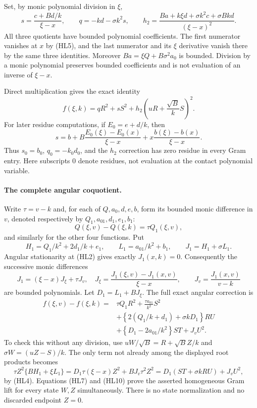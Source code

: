 Set, by monic polynomial division in $\xi$,
\[
 s=\frac{c+Bd/k}{\xi-x},\qquad
 q=-kd-\sigma k^2s,\qquad
 h_2=\frac{Ba+k\xi d+\sigma k^2c+\sigma Bkd}
                    {(\xi-x)^2}.                 \tag{HL6}
\]
All three quotients have bounded polynomial coefficients.  The first
numerator vanishes at $x$ by (HL5), and the last numerator and its
$\xi$ derivative vanish there by the same three identities.
Moreover $Ba=\xi Q+B\sigma^2a_0$ is bounded.  Division by a monic
polynomial preserves bounded coefficients and is not evaluation of
an inverse of $\xi-x$.

Direct multiplication gives the exact identity
\[
 f(\xi,k)=qR^2+sS^2
                  +h_2\left(uR+\frac{\sqrt B}{k}S\right)^2.
                                                               \tag{HL7}
\]
For later residue computations, if $E_0=e+d/k$, then
\[
 s=b+B\frac{E_0(\xi)-E_0(x)}{\xi-x}
       +x\frac{b(\xi)-b(x)}{\xi-x}.                \tag{HL8}
\]
Thus $s_0=b_0$, $q_0=-k_0d_0$, and the $h_2$ correction has zero
residue in every Gram entry.  Here subscripts $0$ denote residues,
not evaluation at the contact polynomial variable.

\paragraph{The complete angular coquotient.}
Write $\tau=v-k$ and, for each of $Q,a_0,d,e,b$, form its bounded
monic difference in $v$, denoted respectively by
$Q_1,a_{01},d_1,e_1,b_1$:
\[
 Q(\xi,v)-Q(\xi,k)=\tau Q_1(\xi,v),
\]
and similarly for the other four functions.  Put
\[
 H_1=Q_1/k^2+2d_1/k+e_1,\qquad
 L_1=a_{01}/k^2+b_1,\qquad J_1=H_1+\sigma L_1.
\]
Angular stationarity at (HL2) gives exactly $J_1(x,k)=0$.
Consequently the successive monic differences
\[
 J_1=(\xi-x)J_\xi+\tau J_v,
 \quad
 J_\xi=\frac{J_1(\xi,v)-J_1(x,v)}{\xi-x},\qquad
 J_v=\frac{J_1(x,v)}{v-k}                            \tag{HL9}
\]
are bounded polynomials.  Let $D_1=L_1+BJ_\xi$.  The full exact
angular correction is
\begin{align*}
 f(\xi,v)-f(\xi,k)={}&
 \tau Q_1R^2+\frac{\tau a_{01}}{k^2}S^2\\
 &+\left\{2(Q_1/k+d_1)+\sigma kD_1\right\}RU\\
 &+\left\{D_1-2a_{01}/k^2\right\}ST+J_vU^2.       \tag{HL10}
\end{align*}
To check this without any division, use
$uW/\sqrt B=R+\sqrt B Z/k$ and
$\sigma W=(uZ-S)/k$.  The only term not already among the displayed
root products becomes
\[
 \tau Z^2\{BH_1+\xi L_1\}
 =D_1\tau(\xi-x)Z^2+BJ_v\tau^2Z^2
 =D_1(ST+\sigma kRU)+J_vU^2,
\]
by (HL4).  Equations (HL7) and (HL10) prove the asserted homogeneous
Gram lift for every state $W,Z$ simultaneously.  There is no state
normalization and no discarded endpoint $Z=0$.

